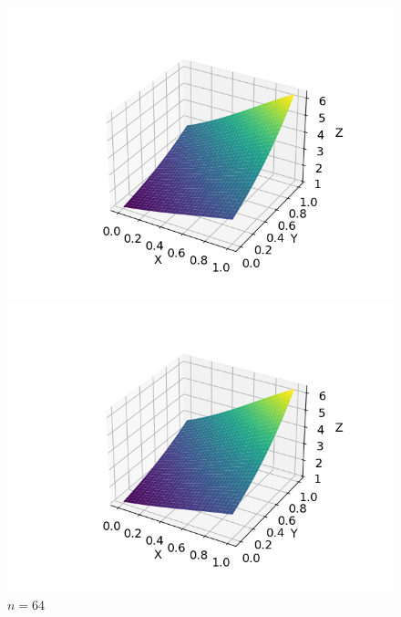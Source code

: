 \documentclass{ctexart}
\begin{document}
\begin{sloppypar}
\begin{figure}[H]
  \begin{minipage}[t]{0.5\linewidth}
    \centering
    \includegraphics[scale = 0.5]{f1_D_32.png}
    \caption{$n = 32$}
  \end{minipage}
  \begin{minipage}[t]{0.5\linewidth}
    \centering
    \includegraphics[scale = 0.5]{f1_D_64.png}
    \caption{$n = 64$}
  \end{minipage}
  \label{fig2}
\end{figure}


\end{sloppypar}
\end{document}
